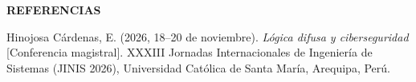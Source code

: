 \documentclass[12pt,a4paper]{article}
\newcommand{\llav}{\symbol{60}\symbol{60}}
\newcommand{\rlav}{\symbol{62}\symbol{62}}
\newcommand{\marcadornospace}[1]{\llav#1\rlav}
\newcommand{\seccionref}{%
  \vspace{0.65cm}%
  {\centering\bfseries\fontsize{12pt}{14pt}\selectfont\marcadornospace{REFERENCIAS}\par}%
  \vspace{0.30cm}%
}
\begin{document}
\seccionref

\noindent
\hangindent=1.27cm
Hinojosa Cárdenas, E. (2026, 18--20 de noviembre). \textit{Lógica difusa y ciberseguridad} [Conferencia magistral]. XXXIII Jornadas Internacionales de Ingeniería de Sistemas (JINIS 2026), Universidad Católica de Santa María, Arequipa, Perú.
\end{document}

